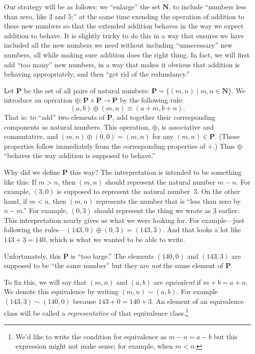 \documentclass[10pt, a4paper, twocolumn]{article}
\newcommand{\set}[1]{\mathbold{#1}}
\newcommand{\N}{\set{N}}
\newcommand{\pairs}{\set{P}}
\newcommand{\minus}[1]{\underline{#1}}
\begin{document}
Our strategy will be as follows: we ``enlarge'' the set $\N$, to
include ``numbers less than zero, like $\minus{3}$ and $\minus{5}$;''
at the same time exending the operation of addition to these new
numbers so that the extended addition behaves in the way we expect
addition to behave. It is slightly tricky to do this in a way that
ensures we have included all the new numbers we need without
including ``unnecessary'' new numbers, all while making sure addition
does the right thing. In fact, we will first add ``too many'' new
numbers, in a way that makes it obvious that addition is behaving
appropriately, and then ``get rid of the redundancy.''

Let $\pairs$ be the set of all pairs of natural numbers: $\pairs =
\{(m, n) \mid m,n\in \N\}$. We introduce an operation
$\oplus:\pairs\times\pairs\to\pairs$ by the following rule:
\begin{equation}\label{pairs:addition}
  (a, b) \oplus (m, n) \equiv (a + m, b + n).
\end{equation}
That is: to ``add'' two elements of $\pairs$, add together their
corresponding components as natural numbers. This operation, $\oplus$, is
associative and commutative, and $(m,n)\oplus(0,0) = (m,n)$ for any
$(m,n)\in\pairs$. (Those properties follow immediately from the
corresponding properties of $+$.) Thus $\oplus$ ``behaves the way addition
is supposed to behave.''

Why did we define $\pairs$ this way? The interpretation is intended to
be something like this: If $m>n$, then $(m,n)$ should represent the
natural number $m-n$. For example, $(3,0)$ is supposed to represent
the natural number~$3$. On the other hand, if $m<n$, then $(m,n)$
represents the number that is ``less than zero by $n-m$.'' For
example, $(0,3)$ should represent the thing we wrote as $\minus{3}$
earlier. This interpretation nearly gives us what we were looking
for. For example---just following the rules---$(143,0) \oplus (0,3) =
(143,3)$. And that looks a lot like $143+\minus{3}=140$, which is what
we wanted to be able to write.

Unfortunately, this $\pairs$ is ``too large.'' The elements $(140,0)$
and $(143,3)$ are supposed to be ``the same number'' but they are
\emph{not} the same element of $\pairs$.

To fix this, we will say that $(m,n)$ and $(a,b)$ are
\emph{equivalent} if $m + b = a + n$. We denote this equivalence by
writing $(m,n) \sim (a,b)$. For example $(143,3)\sim(140,0)$ because
$143+0=140+3$. An element of an equivalence class will be called a
\emph{representative} of that equivalence class.\footnote{We'd like to
write the condition for equivalence as $m-n=a-b$ but this expression
might not make sense; for example, when $m<n$.}
\end{document}
